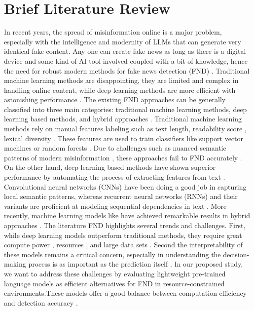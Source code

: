 \documentclass{article}
\begin{document}
\section{Brief Literature Review}
 In recent years, the spread of misinformation online is a major problem, especially with the intelligence and modernity of LLMs that can generate very identical fake content\cite{hu2022deep}. Any one can create fake news as long as there is a digital device and some kind of AI tool involved coupled with a bit of knowledge, hence the need for robust modern methods for fake news detection (FND) \cite{alghamdi2024unveiling}. Traditional machine learning methods are disappointing, they are limited and complex in handling online content, while deep learning methods are more efficient with astonishing performance \cite{soga2024exploiting}.
The existing FND approaches can be generally classified into three main categories: traditional machine learning methods, deep learning based methods, and hybrid approaches \cite{roumeliotis2025fake}. Traditional machine learning methods rely on manual features labeling such as text length, readability score , lexical diversity \cite{e2024ensemble}. These features are used to train classifiers like support vector machines or random forests \cite{zamani2022optimized}. Due to challenges such as nuanced semantic patterns of modern misinformation , these approaches fail to FND accurately \cite{mouratidis2025misinformation}. On the other hand, deep learning based methods have shown superior performance by automating the process of extracting features from text \cite{thota2018fake}. Convolutional neural networks (CNNs) have been doing a good job in capturing local semantic patterns, whereas recurrent neural networks (RNNs) and their variants are proficient at modeling sequential dependencies in text \cite{al2024ensemble}. More recently, machine learning models like  have achieved remarkable results in hybrid approaches \cite{azevedo2024hybrid}.
The literature FND highlights several trends and challenges. First, while deep learning models outperform traditional methods, they require great compute power , resources , and large data sets \cite{soga2024exploiting}. Second the interpretability of these models remains a critical concern, especially in  understanding the decision-making process is as important as the prediction itself \cite{xue2021detecting}.
In our proposed study, we want to address these challenges by evaluating lightweight pre-trained language models as efficient alternatives for FND in resource-constrained environments.These models offer a good balance between computation efficiency and detection accuracy \cite{kumar2024feature}.
\end{document}
